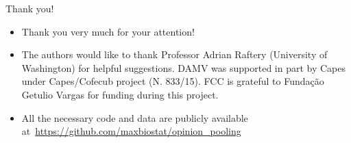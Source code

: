 \begin{frame}{Thank you!}
 \begin{itemize}
  \item Thank you very much for your attention!
  \item The authors would like to thank Professor Adrian Raftery (University of Washington) for helpful suggestions.
DAMV was supported in part by Capes under Capes/Cofecub project (N. 833/15).
FCC is grateful to Funda\c{c}\~ao Getulio Vargas for funding during this project.
  \item All the necessary code and data are publicly available at~\url{https://github.com/maxbiostat/opinion_pooling}
 \end{itemize}
\end{frame}